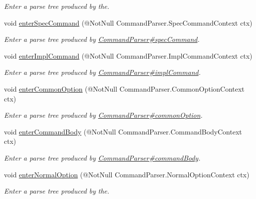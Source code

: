 \begin{DoxyCompactItemize}
\begin{DoxyCompactList}\small\item\em Enter a parse tree produced by the. \end{DoxyCompactList}\item 
void \hyperlink{classedu_1_1udel_1_1cis_1_1vsl_1_1civl_1_1run_1_1common_1_1CIVLCommandListener_a00d9689c021525e052278ba5325b3764}{enter\+Spec\+Command} (@Not\+Null Command\+Parser.\+Spec\+Command\+Context ctx)
\begin{DoxyCompactList}\small\item\em Enter a parse tree produced by \hyperlink{}{Command\+Parser\#spec\+Command}. \end{DoxyCompactList}\item 
void \hyperlink{classedu_1_1udel_1_1cis_1_1vsl_1_1civl_1_1run_1_1common_1_1CIVLCommandListener_a3e9200c308a85997b4fbc636620c4aac}{enter\+Impl\+Command} (@Not\+Null Command\+Parser.\+Impl\+Command\+Context ctx)
\begin{DoxyCompactList}\small\item\em Enter a parse tree produced by \hyperlink{}{Command\+Parser\#impl\+Command}. \end{DoxyCompactList}\item 
void \hyperlink{classedu_1_1udel_1_1cis_1_1vsl_1_1civl_1_1run_1_1common_1_1CIVLCommandListener_afb8e0eb7a327b0a2f47c35e273583d54}{enter\+Common\+Option} (@Not\+Null Command\+Parser.\+Common\+Option\+Context ctx)
\begin{DoxyCompactList}\small\item\em Enter a parse tree produced by \hyperlink{}{Command\+Parser\#common\+Option}. \end{DoxyCompactList}\item 
void \hyperlink{classedu_1_1udel_1_1cis_1_1vsl_1_1civl_1_1run_1_1common_1_1CIVLCommandListener_ac9f79606e749b49a41f30bde571e1044}{enter\+Command\+Body} (@Not\+Null Command\+Parser.\+Command\+Body\+Context ctx)
\begin{DoxyCompactList}\small\item\em Enter a parse tree produced by \hyperlink{}{Command\+Parser\#command\+Body}. \end{DoxyCompactList}\item 
void \hyperlink{classedu_1_1udel_1_1cis_1_1vsl_1_1civl_1_1run_1_1common_1_1CIVLCommandListener_a7515a0590a543c846a1e3d47b05ca8e0}{enter\+Normal\+Option} (@Not\+Null Command\+Parser.\+Normal\+Option\+Context ctx)
\begin{DoxyCompactList}\small\item\em Enter a parse tree produced by the. \end{DoxyCompactList}\item 

\end{DoxyCompactItemize}
